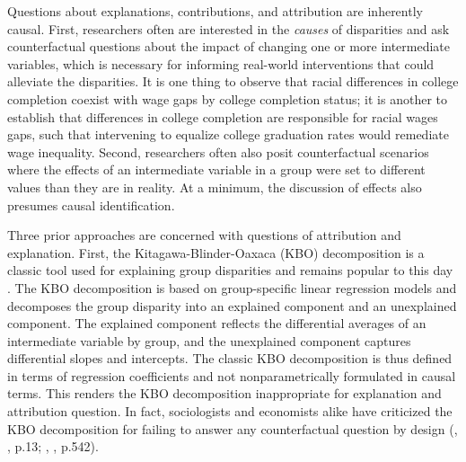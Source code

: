 \documentclass[12pt,a4paper]{article}
\begin{document}
Questions about explanations, contributions, and attribution \citep[e.g.,][]{morgan_models_2012,barber_black-white_2015,mize_sexual_2016,brady_rethinking_2017, bernardi_compensatory_2020,storer_what_2020,zajacova_pain_2021} are inherently causal. First, researchers often are interested in the \emph{causes} of disparities and ask counterfactual questions about the impact of changing one or more intermediate variables, which is necessary for informing real-world interventions that could alleviate the disparities. It is one thing to observe that racial differences in college completion coexist with wage gaps by college completion status; it is another to establish that differences in college completion are responsible for racial wages gaps, such that intervening to equalize college graduation rates would remediate wage inequality. Second, researchers often also posit counterfactual scenarios where the effects of an intermediate variable in a group were set to different values than they are in reality. At a minimum, the discussion of effects also presumes causal identification. 

Three prior approaches are concerned with questions of attribution and explanation.  
First, the Kitagawa-Blinder-Oaxaca (KBO) decomposition \citep{kitagawa_components_1955, blinder_wage_1973, oaxaca_male-female_1973} is a classic tool used for explaining group disparities and remains popular to this day \citep[e.g.,][]{barber_black-white_2015, mize_sexual_2016,laurison_class_2016, storer_what_2020, zajacova_pain_2021}. The KBO decomposition is based on group-specific linear regression models and decomposes the group disparity into an explained component and an unexplained component. The explained component reflects the differential averages of an intermediate variable by group, and the unexplained component captures differential slopes and intercepts. The classic KBO decomposition is thus defined in terms of regression coefficients and not nonparametrically formulated in causal terms. This renders the KBO decomposition inappropriate for explanation and attribution question. In fact, sociologists and economists alike have criticized the KBO decomposition for failing to answer any  counterfactual question by design (\citeauthor{fortin_decomposition_2011}, \citeyear{fortin_decomposition_2011}, p.13; \citeauthor{lundberg_what_2021}, \citeyear{lundberg_what_2021}, p.542). 
\end{document}
